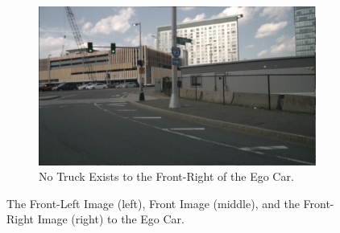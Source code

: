 \documentclass{article} %
\begin{document}
\begin{itemize}
\begin{figure}[H]
\begin{subfigure}[t]{0.3\textwidth}
        \includegraphics[width=\linewidth]{Figures/exam2_front_right_truck.png}
        \caption{\small No Truck Exists to the Front-Right of the Ego Car.}
    \end{subfigure}
    \caption{The Front-Left Image (left), Front Image (middle), and the Front-Right Image (right) to the Ego Car.}
    \label{fig:misaligned-examples}
\end{figure}    


\end{itemize}
\end{document}
